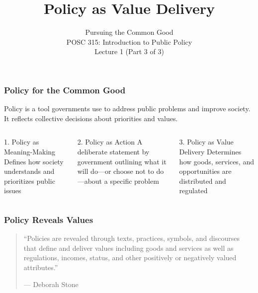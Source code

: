 \documentclass[10pt]{beamer}
\begin{document}
\title{Policy as Value Delivery}
\subtitle{Pursuing the Common Good\\POSC 315: Introduction to Public Policy\\Lecture 1 (Part 3 of 3)}
\date{}

\maketitle

\begin{frame}
\frametitle{Policy for the Common Good}

\begin{block}{}
Policy is a tool governments use to address public problems and improve society. It reflects collective decisions about priorities and values.
\end{block}

\vspace{0.5cm}

\begin{columns}
\begin{column}{0.32\textwidth}
\begin{block}{1. Policy as Meaning-Making}
\pause
Defines how society understands and prioritizes public issues
\end{block}
\end{column}

\begin{column}{0.32\textwidth}
\begin{block}{2. Policy as Action}
\pause
A deliberate statement by government outlining what it will do---or choose not to do---about a specific problem
\end{block}
\end{column}

\begin{column}{0.32\textwidth}
\begin{block}{3. Policy as Value Delivery}
\pause
Determines how goods, services, and opportunities are distributed and regulated
\end{block}
\end{column}
\end{columns}

\end{frame}

\begin{frame}
\frametitle{Policy Reveals Values}

\begin{quotation}
``Policies are revealed through texts, practices, symbols, and discourses that define and deliver values including goods and services as well as regulations, incomes, status, and other positively or negatively valued attributes.''

\vspace{0.5cm}
\hfill --- Deborah Stone
\end{quotation}

\end{frame}
\end{document}
